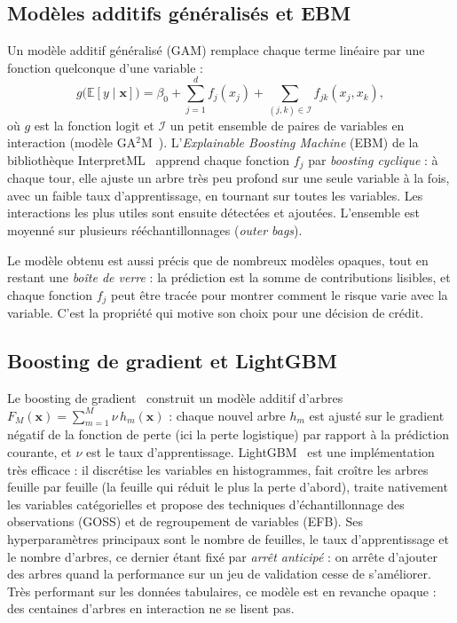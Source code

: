\subsection{Modèles additifs généralisés et EBM}

Un modèle additif généralisé (GAM) remplace chaque terme linéaire par une fonction quelconque d'une variable :
\begin{equation}
  g\big(\mathbb{E}[y \mid \bm{x}]\big) = \beta_0 + \sum_{j=1}^{d} f_j(x_j) + \sum_{(j,k) \in \mathcal{I}} f_{jk}(x_j, x_k),
\end{equation}
où $g$ est la fonction logit et $\mathcal{I}$ un petit ensemble de paires de variables en interaction (modèle
GA$^2$M~\cite{lou2013}). L'\emph{Explainable Boosting Machine} (EBM) de la bibliothèque InterpretML~\cite{nori2019}
apprend chaque fonction $f_j$ par \emph{boosting cyclique} : à chaque tour, elle ajuste un arbre très peu profond sur
une seule variable à la fois, avec un faible taux d'apprentissage, en tournant sur toutes les variables. Les
interactions les plus utiles sont ensuite détectées et ajoutées. L'ensemble est moyenné sur plusieurs
rééchantillonnages (\textit{outer bags}).

Le modèle obtenu est aussi précis que de nombreux modèles opaques, tout en restant une \emph{boîte de verre} : la
prédiction est la somme de contributions lisibles, et chaque fonction $f_j$ peut être tracée pour montrer comment le
risque varie avec la variable. C'est la propriété qui motive son choix pour une décision de crédit.

\subsection{Boosting de gradient et LightGBM}

Le boosting de gradient~\cite{friedman2001} construit un modèle additif d'arbres
$F_M(\bm{x}) = \sum_{m=1}^{M} \nu\, h_m(\bm{x})$ : chaque nouvel arbre $h_m$ est ajusté sur le gradient négatif de
la fonction de perte (ici la perte logistique) par rapport à la prédiction courante, et $\nu$ est le taux
d'apprentissage. LightGBM~\cite{ke2017} est une implémentation très efficace : il discrétise les variables en
histogrammes, fait croître les arbres feuille par feuille (la feuille qui réduit le plus la perte d'abord), traite
nativement les variables catégorielles et propose des techniques d'échantillonnage des observations (GOSS) et de
regroupement de variables (EFB). Ses hyperparamètres principaux sont le nombre de feuilles, le taux d'apprentissage
et le nombre d'arbres, ce dernier étant fixé par \emph{arrêt anticipé} : on arrête d'ajouter des arbres quand la
performance sur un jeu de validation cesse de s'améliorer. Très performant sur les données tabulaires, ce modèle
est en revanche opaque : des centaines d'arbres en interaction ne se lisent pas.

